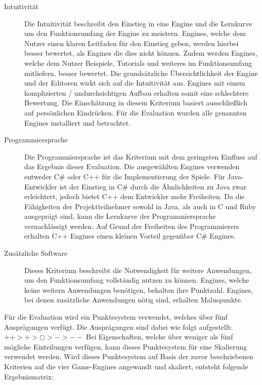 \begin{description}
			\item[Intuitivität]{Die Intuitivität beschreibt den Einstieg in eine Engine und die Lernkurve um den Funktionsumfang der Engine zu meistern. Engines, welche dem Nutzer einen klaren Leitfaden für den Einstieg geben, werden hierbei besser bewertet, als Engines die dies nicht können. Zudem werden Engines, welche dem Nutzer Beispiele, Tutorials und weiteres im Funktionsumfang mitliefern, besser bewertet. Die grundsätzliche Übersichtlichkeit der Engine und der Editoren wirkt sich auf die Intuitivität aus. Engines mit einem komplizierten / undurchsichtigen Aufbau erhalten somit eine schlechtere Bewertung. Die Einschätzung in diesem Kriterium basiert ausschließlich auf persönlichen Eindrücken. Für die Evaluation wurden alle genannten Engines installiert und betrachtet.}
			\item[Programmiersprache]{Die Programmiersprache ist das Kriterium mit dem geringsten Einfluss auf das Ergebnis dieser Evaluation. Die ausgewählten Engines verwenden entweder C\# oder C++ für die Implementierung der Spiele. Für Java-Entwickler ist der Einstieg in C\# durch die Ähnlichkeiten zu Java zwar erleichtert, jedoch bietet C++ dem Entwickler mehr Freiheiten. Da die Fähigkeiten der Projektteilnehmer sowohl in Java, als auch in C und Ruby ausgeprägt sind, kann die Lernkurve der Programmiersprache vernachlässigt werden. Auf Grund der Freiheiten des Programmierers erhalten C++ Engines einen kleinen Vorteil gegenüber C\# Engines.}
			\item[Zusätzliche Software]{Dieses Kriterium beschreibt die Notwendigkeit für weitere Anwendungen, um den Funktionsumfang vollständig nutzen zu können. Engines, welche keine weitern Anwendungen benötigen, behalten ihre Punktzahl. Engines, bei denen zusätzliche Anwendungen nötig sind, erhalten Maluspunkte.}
		\end{description}
		Für die Evaluation wird ein Punktesystem verwendet, welches über fünf Ausprägungen verfügt. Die Ausprägungen sind dabei wie folgt aufgestellt: $ ++ > + > \bigcirc > - > -- $
		Bei Eigenschaften, welche über weniger als fünf mögliche Einteilungen verfügen, kann dieses Punktesystem für eine Skalierung verwendet werden. Wird dieses Punktesystem auf Basis der zuvor beschriebenen Kriterien auf die vier Game-Engines angewandt und skaliert, entsteht folgende Ergebnismatrix:

